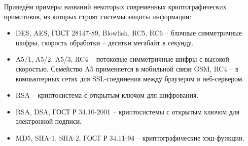 Приведём примеры названий некоторых современных криптографических примитивов, из которых строят системы защиты информации:
\begin{itemize}
    \item DES, AES, ГОСТ 28147-89, Blowfish, RC5, RC6 -- блочные симметричные шифры, скорость обработки -- десятки мегабайт в секунду.
    \item A5/1, A5/2, A5/3, RC4 -- потоковые симметричные шифры с высокой скоростью. Семейство A5 применяется в мобильной связи GSM, RC4 -- в компьютерных сетях для SSL-соединения между браузером и веб-сервером.
    \item RSA -- криптосистема с открытым ключом для шифрования.
    \item RSA, DSA, ГОСТ Р 34.10-2001 -- криптосистемы с открытым ключом для электронной подписи.
    \item MD5, SHA-1, SHA-2, ГОСТ Р 34.11-94 -- криптографические хэш-функции.
\end{itemize}




